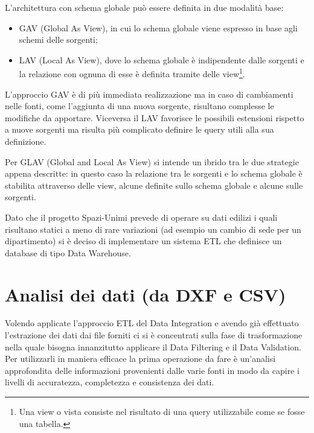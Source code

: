 \documentclass[12pt]{report}
\begin{document}
\vspace{5mm} %

L'architettura con schema globale può essere definita in due modalità base:
\begin{itemize}
\item GAV (Global As View), in cui lo schema globale viene espresso in base agli schemi delle sorgenti;
\item LAV (Local As View), dove lo schema globale è indipendente dalle sorgenti e la relazione con ognuna di esse è definita tramite delle view\footnote{Una view o vista consiste nel risultato di una query utilizzabile come se fosse una tabella.}. 
\end{itemize}

L'approccio GAV è di più immediata realizzazione ma in caso di cambiamenti nelle fonti, come l'aggiunta di una nuova sorgente, risultano complesse le modifiche da apportare.
Viceversa il LAV favorisce le possibili estensioni rispetto a nuove sorgenti ma risulta più complicato definire le query utili alla sua definizione.     

Per GLAV (Global and Local As View) si intende un ibrido tra le due strategie appena descritte: in questo caso la relazione tra le sorgenti e lo schema globale è stabilita attraverso delle view, alcune definite sullo schema globale e alcune sulle sorgenti.

\vspace{5mm} %

Dato che il progetto Spazi-Unimi prevede di operare su dati edilizi i quali risultano statici a meno di rare variazioni (ad esempio un cambio di sede per un dipartimento) si è deciso di implementare un sistema ETL che definisce un database di tipo Data Warehouse.

\newpage
\section{Analisi dei dati (da DXF e CSV)}

Volendo applicate l'approccio ETL del Data Integration e avendo già effettuato l'estrazione dei dati dai file forniti ci si è concentrati sulla fase di trasformazione nella quale bisogna innanzitutto applicare il Data Filtering e il Data Validation.
Per utilizzarli in maniera efficace la prima operazione da fare è un'analisi approfondita delle informazioni provenienti dalle varie fonti in modo da capire i livelli di accuratezza, completezza e consistenza dei dati.
\end{document}
